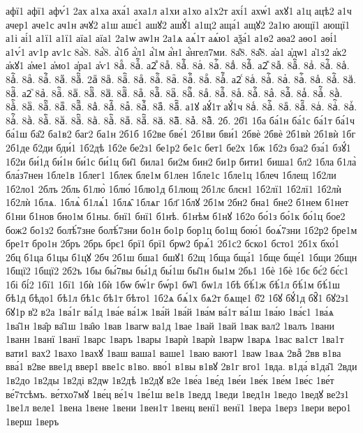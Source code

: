 {афї1
афї1
афѵ́1
2ах
а1ха
аха́1
аха1л
а1хи
а1хо
а1х2т
ахі́1
ахѡ́1
ахꙋ1
а1ц
ацѣ2
а1ч
ачер1
аче1с
ач1н
ачꙋ2
а1ш
ашє́1
ашꙋ2
ашꙋ́1
а1щ2
аща́1
ащꙋ2
2а1ю
ающї1
ающї1
а1і
аі́1
а1ї1
а1ї1
аїа1
аїа1
2а1ѡ
аѡ1н
2а1ѧ
аѧ́1т
аѧ́ю1
аѯа́1
а1ѳ2
аѳа2
аѳо1
аѳі́1
а1ѵ́1
аѵ1р
аѵ1с
8а҆̀8.
8а҆́8.
а҆́1б
а҆́л1
а҆́1м
а҆́н1
а҆́нгел7ми.
8а҆̈8.
8а҆̑8.
а҆а1
а҆дѡ1
а҆1з2
а҆к2
а҆кꙋ1
а҆ме1
а҆мо1
а҆ра1
а҆ѵ1
8аⷠ.
8аⷠ҇.
а2ⷡ
8аⷡ.
8аⷡ҇.
8аⷢ.
8аⷢ҇.
8аⷣ.
8аⷣ҇.
а2ⷤ
8аⷤ.
8аⷤ҇.
8аⷥ.
8аⷥ҇.
8аⷦ.
8аⷦ҇.
8аⷧ.
8аⷧ҇.
8аⷨ.
8аⷨ҇.
2аⷩ
8аⷩ.
8аⷩ҇.
8аⷪ.
8аⷪ҇.
8аⷫ.
8аⷫ҇.
8аⷬ.
8аⷬ҇.
а2ⷭ
8аⷭ.
8аⷭ҇.
8аⷮ.
8аⷮ҇.
8аⷯ.
8аⷯ҇.
8аⷰ.
8аⷰ҇.
а2ⷱ
8аⷱ.
8аⷱ҇.
8аⷲ.
8аⷲ҇.
8аⷳ.
8аⷳ҇.
8аⷴ.
8аⷴ҇.
8аⷵ.
8аⷵ҇.
8аⷶ.
8аⷶ҇.
8аⷷ.
8аⷷ҇.
8аⷸ.
8аⷸ҇.
8аⷹ.
8аⷹ҇.
8аⷺ.
8аⷺ҇.
8аⷻ.
8аⷻ҇.
8аⷼ.
8аⷼ҇.
8аⷽ.
8аⷽ҇.
8аⷾ.
8аⷾ҇.
8аⷿ.
8аⷿ҇.
а1ꙋ
аꙋ́1т
аꙋ́1ч
8аꙴ.
8аꙴ҇.
8аꙵ.
8аꙵ҇.
8аꙶ.
8аꙶ҇.
8аꙷ.
8аꙷ҇.
8аꙸ.
8аꙸ҇.
8аꙹ.
8аꙹ҇.
8аꙺ.
8аꙺ҇.
8аꙻ.
8аꙻ҇.
8а꙼.
8а꙼҇.
8а꙽.
8а꙽҇.
2б.
2б̾1
1ба
ба́1н
ба́1с
ба́1т
ба́1ч
ба́1ш
ба̑2
ба1в2
баг2
ба1н
2б1б
1б2ве
бве́1
2б1ви
бви́1
2бвѐ
2бвѐ
2б1вѝ
2б1вѝ
1бг
2б1де
б2ди
бди́1
1б2дѣ
1б2е
бе2з1
бе1р2
бе1с
бет1
бе2х
1бж
1б2з
бза2
бза́1
бзꙋ́1
1б2и
би́1д
би́1н
би́1с
би́1ц
би̑1
била1
би2м
бин2
би1р
бити1
биша1
бл2
1бла
б1ла̀
бла́з7нен
1бле1в
1блег1
1блек
бле1м
б1лен
1бле1с
1бле1ц
1блеч
1блещ
1б2ли
1б2ло1
2блъ
2бль
б1лю̀
1блю́
1блю1д
б1лющ
2б1лє
блєн1
1б2лї1
1б2лї1
1б2лѝ
1б2лѝ
1блѧ.
1блѧ̀
б1лѧ́1
1блѧ̑
1блѧг
1бл҃
1блꙋ
2б1м
2бн2
бна1
бне2
б1нем
б1нет
б1ни
б1нов
бно1м
б1ны.
бнї1
бнї1
б1нѣ.
б1нѣм
б1нꙋ
1б2о
бо́1з
бо́1к
бо́1ц
бое2
бож2
бо1з2
болѣ́7зне
болѣ́7зни
бо1н
бо1р
бор1ц
бо1щ
бою́1
боѧ́7зни
1б2р2
бре1м
бре1т
бро1н
2бръ
2брь
брє1
брї1
брї1
брѡ2
брѧ́1
2б1с2
бско1
бсто1
2б1х
бхо́1
2бц
б1ца
б1цы
б1цꙋ
2бч
2б1ш
бша1
бшꙋ1
б2щ
1бща
бща́1
1бще
бще́1
1бщи
2бщн
1бщї2
1бщї2
2б2ъ
1бы
бы́7вы
бы́1д
бы́1ш
бы̑1н
бы1м
2бь1
1бѐ
1бѐ
1бє
бє́2
бє́с1
1бі
бі́2
1бї1
1бї1
1бѝ
1бѝ
1бѡ
бѡ́1г
бѡ́р1
бѡ̑1
бѡ1л
1бѣ
бѣ́1ж
бѣ́1л
бѣ́1м
бѣ́1ш
бѣ1д
бѣдо1
бѣ1л
бѣ1с
бѣ1т
бѣто1
1б2ѧ
бѧ́1х
бѧ2т
бѧще1
б҃2
1бꙋ
бꙋ́1д
бꙋ̑1
бꙋ2з1
бꙋ1р
в̾2
в2а
1ва́1г
ва́1д
1ва́е
ва́1ж
1ва́й
1ва́й
1ва́м
ва́1т
ва́1ш
1ва́ю
1ва́є1
1ва́ѧ
1ва̑1н
1ва̑р
ва̑1ш
1ва̑ю
1вав
1вагѡ
ва1д
1вае
1вай
1вай
1вак
вал2
1валъ
1вани
1ванн
1ванї
1ванї
1варс
1варъ
1вары
1варѝ
1варѝ
1варѡ
1варѧ
1вас
ва1ст
1ва1т
вати1
вах2
1вахо
1вахꙋ
1ваш
ваша1
ваше1
1ваю
вают1
1ваѡ
1ваѧ
2ваⷤ
2вв
в1ва
вва́1
в2ве
вве1д
ввер1
вве1с
в1во.
вво́1
в1вы
в1вꙋ
2в1г
вго1
1вда.
в1да́
в1да̑1
2вди
1в2до
1в2ды
1в2ді
в2дѡ
1в2дѣ
1в2дꙋ
в2е
1ве́а
1ве́д
1ве́и
1ве́к
1ве́м
1ве́с
1ве́т
ве́7тсѣмъ.
ве́тхо7мꙋ
1ве́ц
ве́1ч
1ве́1ш
ве1в
1ведд
1веди
1вед1н
1ведо
1ведꙋ
ве2з1
1ве1л
веле1
1вена
1вене
1вени
1вен1т
1венц
венї1
венї1
1вера
1верз
1вери
веро1
1верш
1веръ
}
